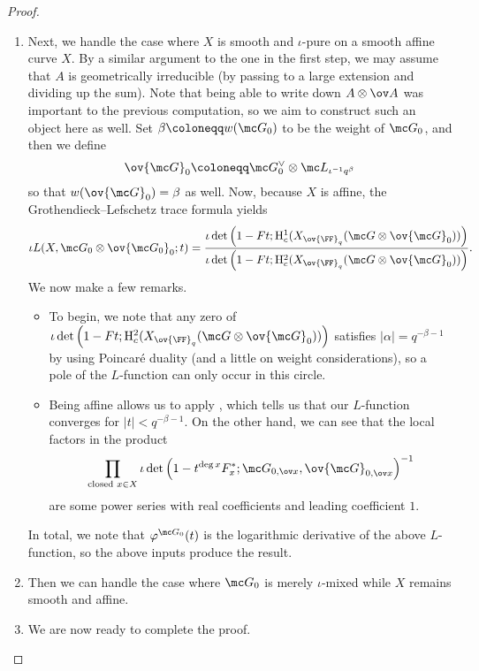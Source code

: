 \documentclass[../notes.tex]{subfiles}
\begin{document}
\begin{proof}
\begin{enumerate}
		\item Next, we handle the case where $X$ is smooth and $\iota$-pure on a smooth affine curve $X$. By a similar argument to the one in the first step, we may assume that $A$ is geometrically irreducible (by passing to a large extension and dividing up the sum). Note that being able to write down $A\otimes\ov A$ was important to the previous computation, so we aim to construct such an object here as well. Set $\beta\coloneqq w(\mc G_0)$ to be the weight of $\mc G_0$, and then we define
		\[\ov{\mc G}_0\coloneqq\mc G_0^\lor\otimes\mc L_{\iota^{-1}q^\beta}\]
		so that $w(\ov{\mc G}_0)=\beta$ as well. Now, because $X$ is affine, the Grothendieck--Lefschetz trace formula yields
		\[\iota L(X,\mc G_0\otimes\ov{\mc G_0}_0;t)=\frac{\iota\det\left(1-Ft;\mathrm H^1_c(X_{\ov{\FF}_q}(\mc G\otimes\ov{\mc G}_0))\right)}{\iota\det\left(1-Ft;\mathrm H^2_c(X_{\ov{\FF}_q}(\mc G\otimes\ov{\mc G}_0))\right)}.\]
		We now make a few remarks.
		\begin{itemize}
			\item To begin, we note that any zero of $\iota\det\left(1-Ft;\mathrm H^2_c(X_{\ov{\FF}_q}(\mc G\otimes\ov{\mc G}_0))\right)$ satisfies $\left|\alpha\right|=q^{-\beta-1}$ by using Poincar\'e duality (and a little on weight considerations), so a pole of the $L$-function can only occur in this circle.
			\item Being affine allows us to apply , which tells us that our $L$-function converges for $\left|t\right|<q^{-\beta-1}$. On the other hand, we can see that the local factors in the product
			\[\prod_{\text{closed }x\in X}\iota\det\left(1-t^{\deg x}F_x^*;\mc G_{0,\ov x},\ov{\mc G}_{0,\ov x}\right)^{-1}\]
			are some power series with real coefficients and leading coefficient $1$.
		\end{itemize}
		In total, we note that $\varphi^{\mc G_0}(t)$ is the logarithmic derivative of the above $L$-function, so the above inputs produce the result.

		\item Then we can handle the case where $\mc G_0$ is merely $\iota$-mixed while $X$ remains smooth and affine.

		\item We are now ready to complete the proof.
	\end{enumerate}
	
\end{proof}
\end{document}
